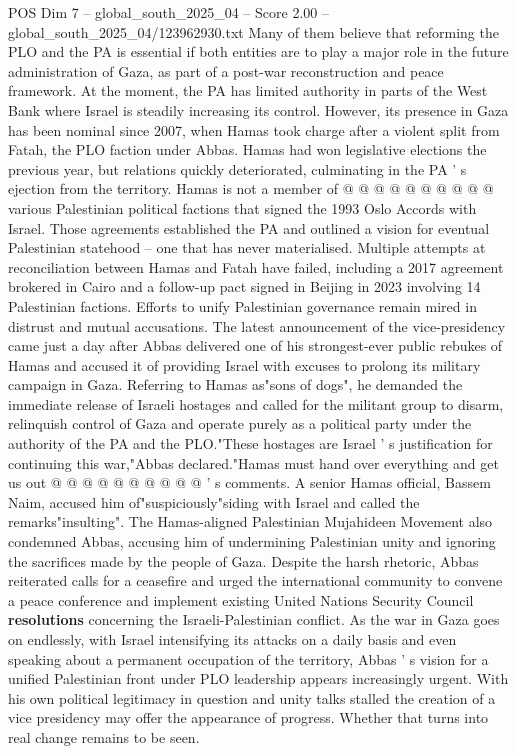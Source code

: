 \begin{textsample}{POS Dim 7 – global\_south\_2025\_04 – Score 2.00 – global\_south\_2025\_04/123962930.txt}
Many of them believe that reforming the PLO and the PA is essential if both entities are to play a major role in the future administration of Gaza, as part of a post-war reconstruction and peace framework.
At the moment, the PA has limited authority in parts of the West Bank where Israel is steadily increasing its control.
However, its presence in Gaza has been nominal since 2007, when Hamas took charge after a violent split from Fatah, the PLO faction under Abbas.
Hamas had won legislative elections the previous year, but relations quickly deteriorated, culminating in the PA ' s ejection from the territory.
Hamas is not a member of @ @ @ @ @ @ @ @ @ @ various Palestinian political factions that signed the 1993 Oslo Accords with Israel.
Those agreements established the PA and outlined a vision for eventual Palestinian statehood -- one that has never materialised.
Multiple attempts at reconciliation between Hamas and Fatah have failed, including a 2017 agreement brokered in Cairo and a follow-up pact signed in Beijing in 2023 involving 14 Palestinian factions.
Efforts to unify Palestinian governance remain mired in distrust and mutual accusations.
The latest announcement of the vice-presidency came just a day after Abbas delivered one of his strongest-ever public rebukes of Hamas and accused it of providing Israel with excuses to prolong its military campaign in Gaza.
Referring to Hamas as"sons of dogs", he demanded the immediate release of Israeli hostages and called for the militant group to disarm, relinquish control of Gaza and operate purely as a political party under the authority of the PA and the PLO."These hostages are Israel ' s justification for continuing this war,"Abbas declared."Hamas must hand over everything and get us out @ @ @ @ @ @ @ @ @ @ ' s comments.
A senior Hamas official, Bassem Naim, accused him of"suspiciously"siding with Israel and called the remarks"insulting".
The Hamas-aligned Palestinian Mujahideen Movement also condemned Abbas, accusing him of undermining Palestinian unity and ignoring the sacrifices made by the people of Gaza.
Despite the harsh rhetoric, Abbas reiterated calls for a ceasefire and urged the international community to convene a peace conference and implement existing United Nations Security Council \textbf{resolutions} concerning the Israeli-Palestinian conflict.
As the war in Gaza goes on endlessly, with Israel intensifying its attacks on a daily basis and even speaking about a permanent occupation of the territory, Abbas ' s vision for a unified Palestinian front under PLO leadership appears increasingly urgent.
With his own political legitimacy in question and unity talks stalled the creation of a vice presidency may offer the appearance of progress.
Whether that turns into real change remains to be seen.

\end{textsample}
